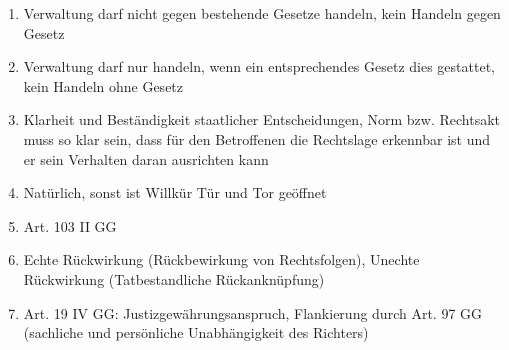 \documentclass{article}
\begin{document}
\begin{enumerate}[label=(\alph*)]
		\item Verwaltung darf nicht gegen bestehende Gesetze handeln, kein Handeln gegen Gesetz
		\item Verwaltung darf nur handeln, wenn ein entsprechendes Gesetz dies gestattet, kein Handeln ohne Gesetz
		\item Klarheit und Beständigkeit staatlicher Entscheidungen, Norm bzw. Rechtsakt muss so klar sein, dass für den Betroffenen die Rechtslage erkennbar ist und er sein Verhalten daran ausrichten kann
		\item Natürlich, sonst ist Willkür Tür und Tor geöffnet
		\item Art. 103 II GG
		\item Echte Rückwirkung (Rückbewirkung von Rechtsfolgen), Unechte Rückwirkung (Tatbestandliche Rück\-anknüpfung)
		\item Art. 19 IV GG: Justizgewährungsanspruch, Flankierung durch Art. 97 GG (sachliche und persönliche Unabhängigkeit des Richters)
	\end{enumerate}
	
\end{document}
